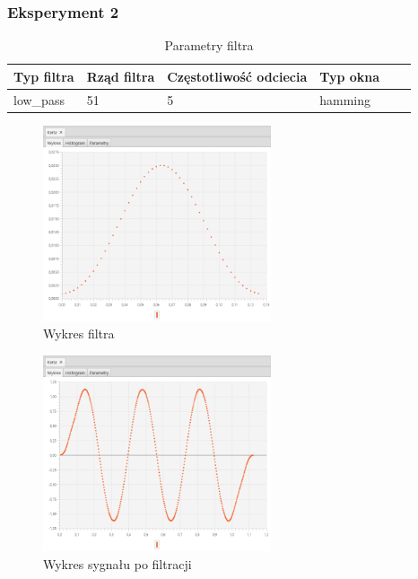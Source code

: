 \documentclass[12pt]{article}
\begin{document}
{{            \subsubsection{Eksperyment 2} {
                \begin{table}[H]
                \centering
                \begin{tabular}{|l|l|l|l|l|l|}
                \hline
                Typ filtra & Rząd filtra & Częstotliwość odciecia & Typ okna  \\\hline
                low\_pass & 51 & 5 & hamming     \\\hline
                \end{tabular}
                \caption{Parametry filtra}
                \end{table}
                \begin{figure}[H]
                \centering
                \includegraphics[width=0.6\textwidth]{img/result/filter/experiment02/data_draw_1b_filter_data_113443.png}
                \caption{Wykres filtra}
                \end{figure}

                \begin{figure}[H]
                \centering
                \includegraphics[width=0.6\textwidth]{img/result/filter/experiment02/data_draw_1b_result_data_113446.png}
                \caption{Wykres sygnału po filtracji}
                \end{figure}
            }
            \newpage

}}
\end{document}
